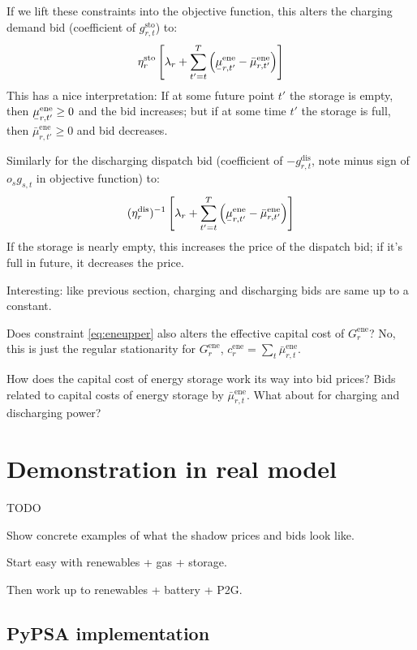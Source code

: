 \documentclass[final,3p]{elsarticle}
\def\l{\lambda} \def\K{\kappa} \def\m{\mu} \def\G{\Gamma} \def\d{\partial}
\begin{document}
If we lift these constraints into the objective function, this alters the
charging demand bid (coefficient of  $g^{\textrm{sto}}_{r,t}$) to:
\begin{equation}
  \eta^{\textrm{sto}}_r \left[ \l_r + \sum_{t'=t}^T \left( \ubar{\mu}^{\textrm{ene}}_{r,t'} -\bar{\mu}^{\textrm{ene}}_{r,t'}  \right) \right]
\end{equation}
This has a nice interpretation: If at some future point $t'$ the storage is
empty, then $\ubar{\mu}^{\textrm{ene}}_{r,t'} \geq 0$  and the bid increases;
but if at some time $t'$ the storage is full, then
$\bar{\mu}^{\textrm{ene}}_{r,t'} \geq 0$ and bid decreases.

Similarly for the discharging dispatch bid (coefficient of
$-g^{\textrm{dis}}_{r,t}$, note minus sign of $o_sg_{s,t}$ in objective
function) to:
\begin{equation}
  (\eta^{\textrm{dis}}_r)^{-1}\left[ \l_r + \sum_{t'=t}^T \left(\ubar{\mu}^{\textrm{ene}}_{r,t'} - \bar{\mu}^{\textrm{ene}}_{r,t'}  \right)\right]
\end{equation}
If the storage is nearly empty, this increases the price of the dispatch bid; if
it's full in future, it decreases the price.

Interesting: like previous section, charging and discharging bids are same up to
a constant.

Does constraint \eqref{eq:eneupper} also alters the effective capital cost of
$G^{\textrm{ene}}_r$? No, this is just the regular stationarity for
$G^{\textrm{ene}}_r$, $ c^{\textrm{ene}}_r = \sum_t
\bar{\mu}^{\textrm{ene}}_{r,t}$.

How does the capital cost of energy storage work its way into bid prices? Bids
related to capital costs of energy storage by $\bar{\mu}^{\textrm{ene}}_{r,t}$.
What about for charging and discharging power?


\section{Demonstration in real model}

TODO

Show concrete examples of what the shadow prices and bids look like.

Start easy with renewables + gas + storage.

Then work up to renewables + battery + P2G.


\subsection{PyPSA implementation}
\end{document}
